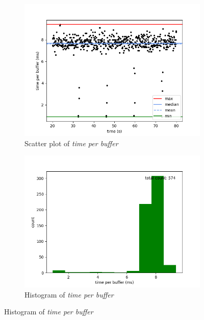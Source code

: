\begin{figure}[H]
    \centering

    \begin{subfigure}[t]{0.5\textwidth}
        \centering
        \includegraphics[scale=0.45]{img/trace_wait_100us_per_buffer_scatter.png}
        \caption{Scatter plot of \textit{time per buffer}}
    \end{subfigure}%
    \begin{subfigure}[t]{0.5\textwidth}
        \centering
        \includegraphics[scale=0.45]{img/trace_wait_100us_per_buffer_hist.png}
        \caption{Histogram of \textit{time per buffer}}
    \end{subfigure}


\end{figure}

